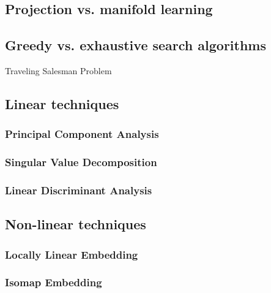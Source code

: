 \clearpage

\subsection{Projection vs. manifold learning}

\subsection{Greedy vs. exhaustive search algorithms}

Traveling Salesman Problem


\subsection{Linear techniques}

\subsubsection{Principal Component Analysis}
\subsubsection{Singular Value Decomposition}
\subsubsection{Linear Discriminant Analysis}

\subsection{Non-linear techniques}

\subsubsection{Locally Linear Embedding}
\subsubsection{Isomap Embedding}
